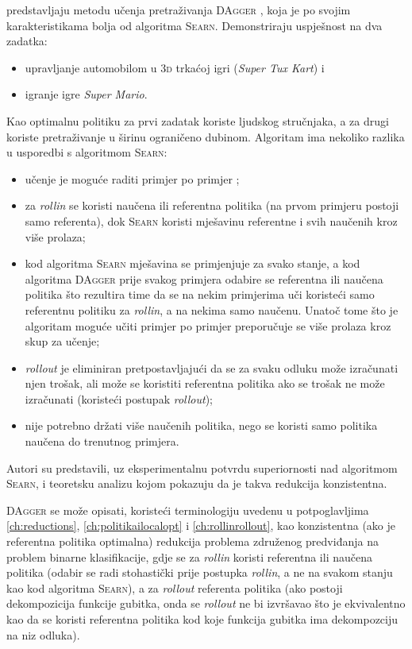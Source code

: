 \citet{ross2011reduction} predstavljaju metodu učenja pretraživanja
\textsc{DAgger} , koja je po svojim
karakteristikama bolja od algoritma \textsc{Searn}. Demonstriraju uspješnost na
dva zadatka:
\begin{itemize}
  \item upravljanje automobilom u \textsc{3d} trkaćoj igri (\textit{Super Tux
  Kart}) i
  \item igranje igre \textit{Super Mario}.
\end{itemize}
Kao optimalnu politiku za prvi zadatak koriste ljudskog stručnjaka, a za drugi
koriste pretraživanje u širinu  ograničeno
dubinom. Algoritam ima nekoliko razlika u usporedbi s algoritmom \textsc{Searn}:
\begin{itemize}
  \item učenje je moguće raditi primjer po primjer ;
  \item za \textit{rollin} se koristi naučena ili referentna politika (na prvom
  primjeru postoji samo referenta), dok \textsc{Searn} koristi mješavinu
  referentne i svih naučenih kroz više prolaza;
  \item kod algoritma \textsc{Searn} mješavina se primjenjuje za svako stanje,
  a kod algoritma \textsc{DAgger} prije svakog primjera odabire se referentna
  ili naučena politika što rezultira time da se na nekim primjerima uči koristeći
  samo referentnu politiku za \textit{rollin}, a na nekima samo naučenu. Unatoč
  tome što je algoritam moguće učiti primjer po primjer preporučuje se više
  prolaza kroz skup za učenje;
  \item \textit{rollout} je eliminiran pretpostavljajući da se za svaku odluku
  može izračunati njen trošak, ali može se koristiti referentna politika ako se
  trošak ne može izračunati (koristeći postupak \textit{rollout});
  \item nije potrebno držati više naučenih politika, nego se koristi samo politika
  naučena do trenutnog primjera.
\end{itemize}
Autori su predstavili, uz eksperimentalnu potvrdu superiornosti nad algoritmom
\textsc{Searn}, i teoretsku analizu kojom pokazuju da je takva redukcija
konzistentna.

\textsc{DAgger} se može opisati, koristeći terminologiju uvedenu u
potpoglavljima \ref{ch:reductions}, \ref{ch:politikailocalopt} i
\ref{ch:rollinrollout}, kao konzistentna (ako je referentna politika optimalna)
redukcija problema združenog predviđanja na problem binarne klasifikacije, gdje
se za \textit{rollin} koristi referentna ili naučena politika (odabir se radi
stohastički prije postupka \textit{rollin}, a ne na svakom stanju kao kod
algoritma \textsc{Searn}), a za \textit{rollout} referenta politika (ako postoji
dekompozicija funkcije gubitka, onda se \textit{rollout} ne bi izvršavao što je
ekvivalentno kao da se koristi referentna politika kod koje funkcija gubitka ima
dekompozciju na niz odluka).
